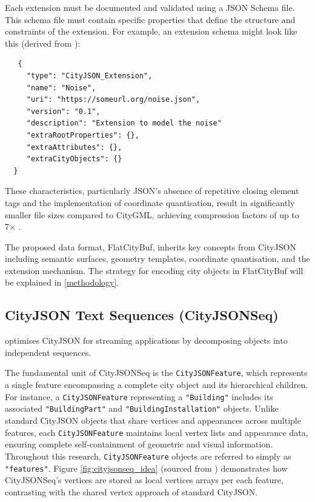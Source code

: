 Each extension must be documented and validated using a JSON Schema file. This schema file must contain specific properties that define the structure and constraints of the extension. For example, an extension schema might look like this (derived from \citet{ledoux_2019}):

\begin{lstlisting}
   {
     "type": "CityJSON_Extension",
     "name": "Noise",
     "uri": "https://someurl.org/noise.json",
     "version": "0.1",
     "description": "Extension to model the noise"
     "extraRootProperties": {},
     "extraAttributes": {},
     "extraCityObjects": {}
  }
\end{lstlisting}

These characteristics, particularly JSON's absence of repetitive closing element tags and the implementation of coordinate quantisation, result in significantly smaller file sizes compared to CityGML, achieving compression factors of up to 7× \citep{ledoux_2019}.

The proposed data format, FlatCityBuf, inherits key concepts from CityJSON including semantic surfaces, geometry templates, coordinate quantisation, and the extension mechanism. The strategy for encoding city objects in FlatCityBuf will be explained in \autoref{methodology}.

\subsection{CityJSON Text Sequences (CityJSONSeq)}
\label{rw:cityjson_enhancements:cityjsonseq}

\citet{ledoux_2024} optimises CityJSON for streaming applications by decomposing objects into independent sequences.

The fundamental unit of CityJSONSeq is the \texttt{CityJSONFeature}, which represents a single feature encompassing a complete city object and its hierarchical children. For instance, a \texttt{CityJSONFeature} representing a \texttt{"Building"} includes its associated \texttt{"BuildingPart"} and \texttt{"BuildingInstallation"} objects. Unlike standard CityJSON objects that share vertices and appearances across multiple features, each \texttt{CityJSONFeature} maintains local vertex lists and appearance data, ensuring complete self-containment of geometric and visual information. Throughout this research, \texttt{CityJSONFeature} objects are referred to simply as \texttt{"features"}. Figure \autoref{fig:cityjsonseq_idea} (sourced from \citet{ledoux_2024}) demonstrates how CityJSONSeq's vertices are stored as local vertices arrays per each feature, contrasting with the shared vertex approach of standard CityJSON.


